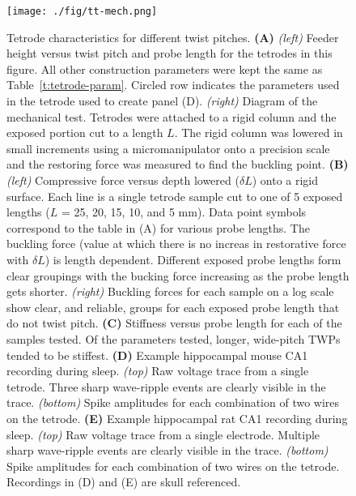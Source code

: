 \documentclass[11pt,a4paper]{article}
\begin{document}
\begin{figure}
\centering
\texttt{[image: ./fig/tt-mech.png]}
\caption{Tetrode characteristics for different twist pitches.
    \textbf{(A)} \textit{(left)} Feeder height versus twist pitch and probe
    length for the tetrodes in this figure. All other construction parameters
    were kept the same as Table~\ref{t:tetrode-param}. Circled row indicates
    the parameters used in the tetrode used to create panel (D).
    \textit{(right)} Diagram of the mechanical test. Tetrodes were attached to a rigid column
    and the exposed portion cut to a length $L$. The rigid column was lowered
    in small increments using a micromanipulator onto a precision scale and the
    restoring force was measured to find the buckling point.
    \textbf{(B)} \textit{(left)} Compressive force versus depth lowered
    ($\delta L$) onto a rigid surface.  Each line is a single tetrode sample
    cut to one of 5 exposed lengths ($L$ = 25, 20, 15, 10, and 5 mm). Data
    point symbols correspond to the table in (A) for various probe lengths.
    The buckling force (value at which there is no increas in restorative force
    with $\delta L$) is length dependent. Different exposed probe lengths form
    clear groupings with the bucking force increasing as the probe length gets
    shorter. \textit{(right)} Buckling forces for each sample on a log scale
    show clear, and reliable, groups for each exposed probe length that do not
    twist pitch.
    \textbf{(C)} Stiffness versus probe length for each of the samples tested.
    Of the parameters tested, longer, wide-pitch TWPs tended to be stiffest.
    \textbf{(D)} Example hippocampal mouse CA1 recording during sleep.
    \textit{(top)} Raw voltage trace from a single tetrode. Three sharp
    wave-ripple events are clearly visible in the trace. \textit{(bottom)}
    Spike amplitudes for each combination of two wires on the tetrode.     
    \textbf{(E)} Example hippocampal rat CA1 recording during sleep.
    \textit{(top)} Raw voltage trace from a single electrode. Multiple sharp
    wave-ripple events are clearly visible in the trace. \textit{(bottom)}
    Spike amplitudes for each combination of two wires on the tetrode.
    Recordings in (D) and (E) are skull referenced. 
} 

\label{f:trode-char}
\end{figure}
\end{document}
